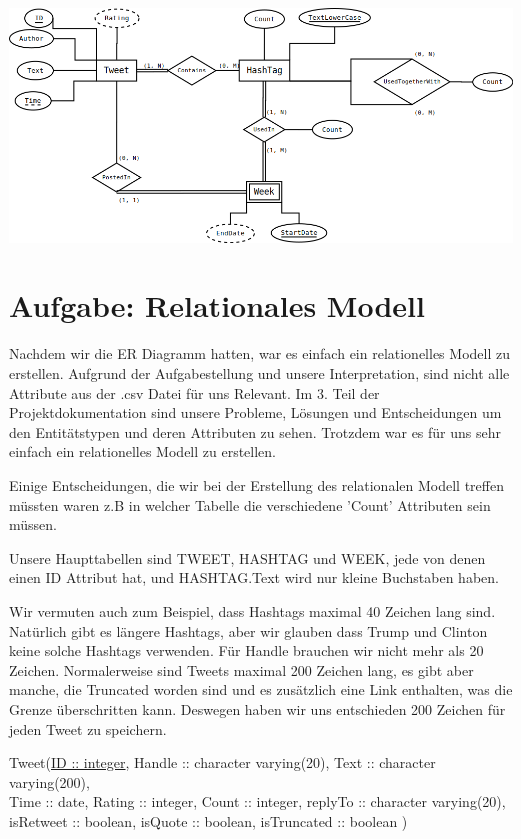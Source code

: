 \vspace{1cm}
\includegraphics[width=\textwidth]{ERDiagramm.png}

\section{Aufgabe: Relationales Modell}

Nachdem wir die ER Diagramm hatten, war es einfach ein relationelles Modell zu erstellen. Aufgrund der Aufgabestellung 
und unsere Interpretation, sind nicht alle Attribute aus der .csv Datei für uns Relevant. Im 3. Teil der Projektdokumentation
sind unsere Probleme, Lösungen und Entscheidungen um den Entitätstypen und deren Attributen zu sehen. Trotzdem war es 
für uns sehr einfach ein relationelles Modell zu erstellen.

Einige Entscheidungen, die wir bei der Erstellung des relationalen Modell treffen müssten waren z.B in welcher Tabelle die 
verschiedene 'Count' Attributen sein müssen.

Unsere Haupttabellen sind TWEET, HASHTAG und WEEK, jede von denen einen ID Attribut hat, und HASHTAG.Text wird nur kleine 
Buchstaben haben. 

Wir vermuten auch zum Beispiel, dass Hashtags maximal 40 Zeichen lang sind. Natürlich gibt es längere Hashtags, aber wir glauben 
dass Trump und Clinton keine solche Hashtags verwenden. Für Handle brauchen wir nicht mehr als 20 Zeichen. Normalerweise sind 
Tweets maximal 200 Zeichen lang, es gibt aber manche, die Truncated worden sind und es zusätzlich eine Link enthalten, was 
die Grenze überschritten kann. Deswegen haben wir uns entschieden 200 Zeichen für jeden Tweet zu speichern.

Tweet(\underline{ID :: integer}, Handle :: character varying(20), Text :: character varying(200), \\
	\hspace*{10mm} Time :: date, Rating :: integer, Count :: integer, replyTo :: character varying(20), \\
    \hspace*{10mm} isRetweet :: boolean, isQuote :: boolean, isTruncated :: boolean ) \\
    
